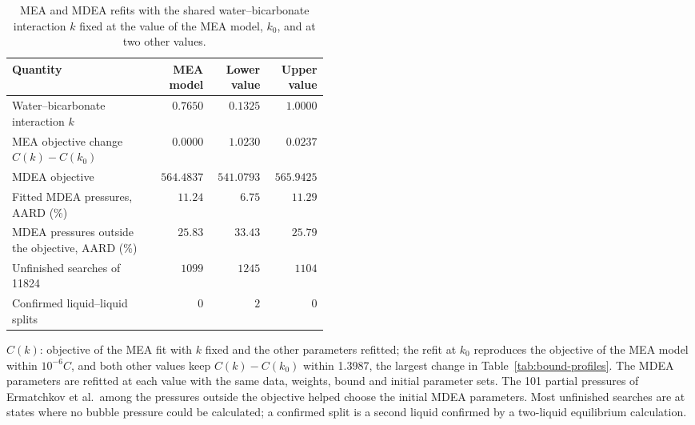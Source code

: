 \begin{table}[!htbp]\small\setlength{\tabcolsep}{3pt}\centering
\caption{MEA and MDEA refits with the shared water--bicarbonate interaction $k$ fixed at the value of the MEA model, $k_0$, and at two other values.}\label{tab:supplement-bicarbonate-sensitivity}
\begin{tabular}{@{}>{\raggedright\arraybackslash}p{0.4600\linewidth}rrr@{}}
\toprule
Quantity & MEA model & Lower value & Upper value \\
\midrule
Water--bicarbonate interaction $k$ & $0.7650$ & $0.1325$ & $1.0000$ \\
MEA objective change $C(k)-C(k_0)$ & $0.0000$ & $1.0230$ & $0.0237$ \\
MDEA objective & $564.4837$ & $541.0793$ & $565.9425$ \\
Fitted MDEA pressures, AARD (\%) & $11.24$ & $6.75$ & $11.29$ \\
MDEA pressures outside the objective, AARD (\%) & $25.83$ & $33.43$ & $25.79$ \\
Unfinished searches of \num{11824} & $1099$ & $1245$ & $1104$ \\
Confirmed liquid--liquid splits & $0$ & $2$ & $0$ \\
\bottomrule
\end{tabular}
\par\smallskip\parbox{\linewidth}{\footnotesize\raggedright $C(k)$: objective of the MEA fit with $k$ fixed and the other parameters refitted; the refit at $k_0$ reproduces the objective of the MEA model within $10^{-6}C$, and both other values keep $C(k)-C(k_0)$ within 1.3987, the largest change in Table~\ref{tab:bound-profiles}. The MDEA parameters are refitted at each value with the same data, weights, bound and initial parameter sets. The 101  partial pressures of Ermatchkov et al.\ among the pressures outside the objective helped choose the initial MDEA parameters. Most unfinished searches are at states where no bubble pressure could be calculated; a confirmed split is a second liquid confirmed by a two-liquid equilibrium calculation.}
\end{table}

